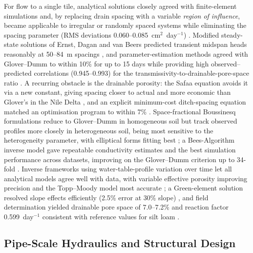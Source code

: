 \documentclass[11pt]{article}
\begin{document}
For flow to a single tile, analytical solutions closely agreed with finite-element simulations and, by replacing drain spacing with a variable \emph{region of influence}, became applicable to irregular or randomly spaced systems while eliminating the spacing parameter (RMS deviations 0.060--0.085~cm$^2$~day$^{-1}$) \parencite{Cooke2001}. Modified steady-state solutions of Ernst, Dagan and van Beers predicted transient midspan heads reasonably at 50--84~m spacings \parencite{SINGH1992}, and parameter-estimation methods agreed with Glover--Dumm to within 10\% for up to 15 days while providing high observed--predicted correlations (0.945--0.993) for the transmissivity-to-drainable-pore-space ratio \parencite{KUMAR1994}. A recurring obstacle is the drainable porosity: the Safaa equation avoids it via a new constant, giving spacing closer to actual and more economic than Glover's in the Nile Delta \parencite{FathAllah2025}, and an explicit minimum-cost ditch-spacing equation matched an optimisation program to within 7\% \parencite{Chahar2010}. Space-fractional Boussinesq formulations reduce to Glover--Dumm in homogeneous soil but track observed profiles more closely in heterogeneous soil, being most sensitive to the heterogeneity parameter, with elliptical forms fitting best \parencite{Mehdinejadiani2013,Mehdinejadiani2020}; a Bees-Algorithm inverse model gave repeatable conductivity estimates and the best simulation performance across datasets, improving on the Glover--Dumm criterion up to 34-fold \parencite{Mehdinejadiani2022}. Inverse frameworks using water-table-profile variation over time let all analytical models agree well with data, with variable effective porosity improving precision and the Topp--Moody model most accurate \parencite{Samani2007}; a Green-element solution resolved slope effects efficiently (2.5\% error at 30\% slope) \parencite{Onyejekwe1999}, and field determination yielded drainable pore space of 7.0--7.2\% and reaction factor 0.599~day$^{-1}$ consistent with reference values for silt loam \parencite{Bahceci2008}.

\subsection{Pipe-Scale Hydraulics and Structural Design}
\end{document}
